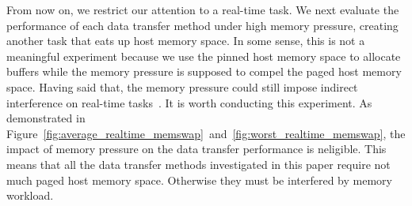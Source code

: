 From now on, we restrict our attention to a real-time task.
We next evaluate the performance of each data transfer method under high
memory pressure, creating another task that eats up host memory space.
In some sense, this is not a meaningful experiment because we use the
pinned host memory space to allocate buffers while the memory pressure
is supposed to compel the paged host memory space.
Having said that, the memory pressure could still impose indirect
interference on real-time tasks~\cite{Kato_RTSJ11, Yang_OSDI08}.
It is worth conducting this experiment.
As demonstrated in
Figure~\ref{fig:average_realtime_memswap}~and~\ref{fig:worst_realtime_memswap},
the impact of memory pressure on the data transfer performance is
neligible.
This means that all the data transfer methods investigated in this paper
require not much paged host memory space.
Otherwise they must be interfered by memory workload.

